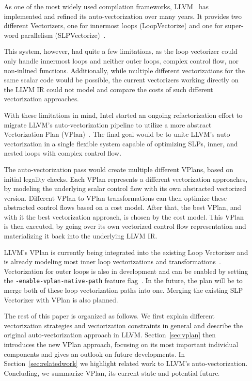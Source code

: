 \documentclass[sigplan,11pt,nonacm]{acmart}
\begin{document}
As one of the most widely used compilation frameworks, LLVM~\cite{10.5555/977395.977673} has 
implemented and refined its auto-vectorization over many years. It provides two different 
Vectorizers, one for innermost loops (LoopVectorize) and one for super-word parallelism 
(SLPVectorize)~\cite{llvmvec}.

This system, however, had quite a few limitations, as the loop vectorizer could only handle
innermost loops and neither outer loops, complex control flow, nor non-inlined functions. 
Additionally, while multiple different vectorizations for the same scalar code 
would be possible, the current vectorizers working directly on the LLVM IR could not model
and compare the costs of such different vectorization approaches.

With these limitations in mind, Intel started an ongoing refactorization effort to migrate LLVM's
auto-vectorization pipeline to utilize a more abstract Vectorization Plan 
(VPlan)~\cite{llvmextloopvec,llvmvplan}. The final goal would be to unite LLVM's auto-vectorization
in a single flexible system capable of optimizing SLPs, inner, and nested loops with complex 
control flow.

The auto-vectorization pass would create multiple different VPlans, based on initial legality 
checks. Each VPlan represents a different vectorization approaches, by modeling the
underlying scalar control flow with its own abstracted vectorized version. Different VPlan-to-VPlan
transformations can then optimize these abstracted control flows based on a cost model.
After that, the best VPlan, and with it the best vectorization approach, is chosen by the cost model.
This VPlan is then executed, by going over its own vectorized control flow representation and
materializing it back into the underlying LLVM IR.

LLVM's VPlan is currently being integrated into the existing Loop Vectorizer and is
already modeling most inner loop vectorizations and transformations~\cite{llvmvplanupdate}. 
Vectorization for outer loops is also in development and can be enabled by setting 
the \texttt{-enable-\allowbreak vplan-\allowbreak native-\allowbreak path} feature 
flag~\cite{llvmouterloop,llvmouterloopstatus}. 
In the future, the plan will be to merge both of these loop vectorization paths into one. 
Merging the existing SLP Vectorizer with VPlan is also planned.

The rest of this paper is organized as follows. We first explain different vectorization
strategies and vectorization constraints in general and describe the original auto-vectorization
approach in LLVM. Section~\ref{sec:vplan} then introduces the new VPlan approach, focusing on
its most important individual components and gives an outlook on future developments. In 
Section~\ref{sec:relatedwork} we highlight related work to LLVM's auto-vectorization. Concluding,
we summarize VPlan, its current state and potential future.
\end{document}
